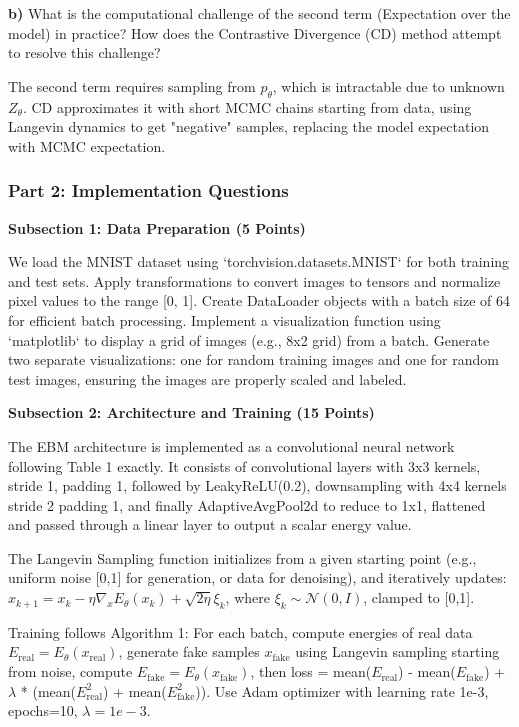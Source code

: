 \documentclass[a4paper,12pt]{article}
\begin{document}
\textbf{b)} What is the computational challenge of the second term (Expectation over the model) in practice? How does the Contrastive Divergence (CD) method attempt to resolve this challenge?

The second term requires sampling from $p_\theta$, which is intractable due to unknown $Z_\theta$. CD approximates it with short MCMC chains starting from data, using Langevin dynamics to get "negative" samples, replacing the model expectation with MCMC expectation.

\subsubsection{Part 2: Implementation Questions}

\textbf{Subsection 1: Data Preparation (5 Points)}

We load the MNIST dataset using `torchvision.datasets.MNIST` for both training and test sets. Apply transformations to convert images to tensors and normalize pixel values to the range [0, 1]. Create DataLoader objects with a batch size of 64 for efficient batch processing. Implement a visualization function using `matplotlib` to display a grid of images (e.g., 8x2 grid) from a batch. Generate two separate visualizations: one for random training images and one for random test images, ensuring the images are properly scaled and labeled.

\textbf{Subsection 2: Architecture and Training (15 Points)}

The EBM architecture is implemented as a convolutional neural network following Table 1 exactly. It consists of convolutional layers with 3x3 kernels, stride 1, padding 1, followed by LeakyReLU(0.2), downsampling with 4x4 kernels stride 2 padding 1, and finally AdaptiveAvgPool2d to reduce to 1x1, flattened and passed through a linear layer to output a scalar energy value.

The Langevin Sampling function initializes from a given starting point (e.g., uniform noise [0,1] for generation, or data for denoising), and iteratively updates: $x_{k+1} = x_k - \eta \nabla_x E_\theta(x_k) + \sqrt{2\eta} \xi_k$, where $\xi_k \sim \mathcal{N}(0,I)$, clamped to [0,1].

Training follows Algorithm 1: For each batch, compute energies of real data $E_{\text{real}} = E_\theta(x_{\text{real}})$, generate fake samples $x_{\text{fake}}$ using Langevin sampling starting from noise, compute $E_{\text{fake}} = E_\theta(x_{\text{fake}})$, then loss = mean($E_{\text{real}}$) - mean($E_{\text{fake}}$) + $\lambda$ * (mean($E_{\text{real}}^2$) + mean($E_{\text{fake}}^2$)). Use Adam optimizer with learning rate 1e-3, epochs=10, $\lambda=1e-3$.
\end{document}
